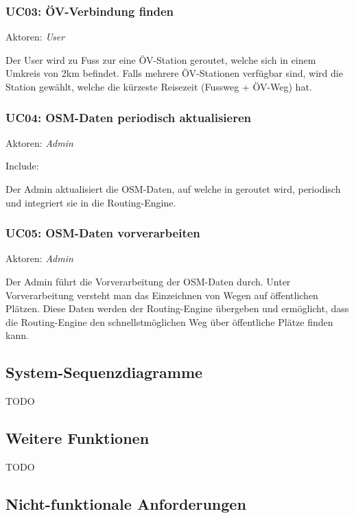 \subsubsection{UC03: ÖV-Verbindung finden}
\label{usecase:UC03}
Aktoren: \emph{User}

Der User wird zu Fuss zur eine ÖV-Station geroutet, welche sich in einem Umkreis von 2km befindet. Falls mehrere ÖV-Stationen verfügbar sind, wird die Station gewählt, welche die kürzeste Reisezeit (Fussweg + ÖV-Weg) hat.

\subsubsection{UC04: OSM-Daten periodisch aktualisieren}
\label{usecase:UC04}
Aktoren: \emph{Admin}

Include: 

Der Admin aktualisiert die \ac{OSM}-Daten, auf welche in  geroutet wird, periodisch und integriert sie in die Routing-Engine.

\subsubsection{UC05: OSM-Daten vorverarbeiten}
\label{usecase:UC05}
Aktoren: \emph{Admin}

Der Admin führt die Vorverarbeitung der \ac{OSM}-Daten durch. Unter Vorverarbeitung versteht man das Einzeichnen von Wegen auf öffentlichen Plätzen. Diese Daten werden der Routing-Engine übergeben und ermöglicht, dass die Routing-Engine den schnellstmöglichen Weg über öffentliche Plätze finden kann.

\subsection{System-Sequenzdiagramme}
\label{sub:System-Sequenzdiagramme}

TODO

\subsection{Weitere Funktionen}
\label{sub:Weitere Funktionen}

TODO

\subsection{Nicht-funktionale Anforderungen}
\label{sub:Nicht-funktionale Anforderungen}


